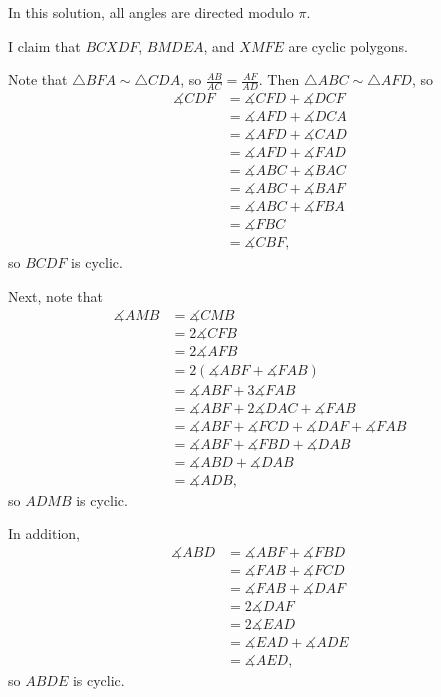 In this solution, all angles are directed modulo $\pi$.

I claim that $BCXDF$, $BMDEA$, and $XMFE$ are cyclic polygons.

Note that $\triangle{BFA}\sim\triangle{CDA}$, so $\frac{AB}{AC}=\frac{AF}{AD}$. Then $\triangle{ABC}\sim\triangle{AFD}$, so \begin{align*}\measuredangle{CDF}&=\measuredangle{CFD}+\measuredangle{DCF}\\&=\measuredangle{AFD}+\measuredangle{DCA}\\&=\measuredangle{AFD}+\measuredangle{CAD}\\&=\measuredangle{AFD}+\measuredangle{FAD}\\&=\measuredangle{ABC}+\measuredangle{BAC}\\&=\measuredangle{ABC}+\measuredangle{BAF}\\&=\measuredangle{ABC}+\measuredangle{FBA}\\&=\measuredangle{FBC}\\&=\measuredangle{CBF},\end{align*} so $BCDF$ is cyclic.

Next, note that \begin{align*}\measuredangle{AMB}&=\measuredangle{CMB}\\&=2\measuredangle{CFB}\\&=2\measuredangle{AFB}\\&=2\left(\measuredangle{ABF}+\measuredangle{FAB}\right)\\&=\measuredangle{ABF}+3\measuredangle{FAB}\\&=\measuredangle{ABF}+2\measuredangle{DAC}+\measuredangle{FAB}\\&=\measuredangle{ABF}+\measuredangle{FCD}+\measuredangle{DAF}+\measuredangle{FAB}\\&=\measuredangle{ABF}+\measuredangle{FBD}+\measuredangle{DAB}\\&=\measuredangle{ABD}+\measuredangle{DAB}\\&=\measuredangle{ADB},\end{align*} so $ADMB$ is cyclic.

In addition, \begin{align*}\measuredangle{ABD}&=\measuredangle{ABF}+\measuredangle{FBD}\\&=\measuredangle{FAB}+\measuredangle{FCD}\\&=\measuredangle{FAB}+\measuredangle{DAF}\\&=2\measuredangle{DAF}\\&=2\measuredangle{EAD}\\&=\measuredangle{EAD}+\measuredangle{ADE}\\&=\measuredangle{AED},\end{align*} so $ABDE$ is cyclic.

